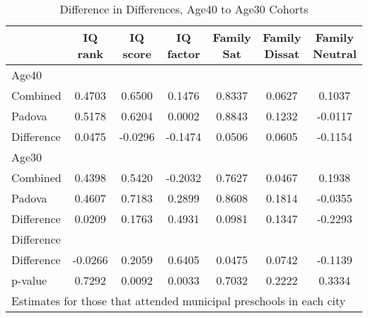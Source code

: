 \begin{table}[htbp]\centering
\caption{Difference in Differences, Age40 to Age30 Cohorts}
\begin{tabular}{l*{6}{c}}
\hline\hline
            &     IQ rank&    IQ score&   IQ factor&  Family Sat&Family Dissat&Family Neutral\\
\hline
Age40       &            &            &            &            &            &            \\
Combined    &      0.4703&      0.6500&      0.1476&      0.8337&      0.0627&      0.1037\\
Padova      &      0.5178&      0.6204&      0.0002&      0.8843&      0.1232&     -0.0117\\
Difference  &      0.0475&     -0.0296&     -0.1474&      0.0506&      0.0605&     -0.1154\\
\hline
Age30       &            &            &            &            &            &            \\
Combined    &      0.4398&      0.5420&     -0.2032&      0.7627&      0.0467&      0.1938\\
Padova      &      0.4607&      0.7183&      0.2899&      0.8608&      0.1814&     -0.0355\\
Difference  &      0.0209&      0.1763&      0.4931&      0.0981&      0.1347&     -0.2293\\
\hline
Difference  &            &            &            &            &            &            \\
Difference  &     -0.0266&      0.2059&      0.6405&      0.0475&      0.0742&     -0.1139\\
p-value     &      0.7292&      0.0092&      0.0033&      0.7032&      0.2222&      0.3334\\
\hline\hline
\multicolumn{7}{l}{\footnotesize Estimates for those that attended municipal preschools in each city}\\
\end{tabular}
\end{table}

